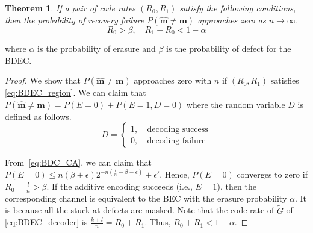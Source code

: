 \documentclass[10pt,twocolumn,twoside,submit]{JCNtran}
\newtheorem{theorem}{Theorem}
\begin{document}
	\begin{theorem} \label{thm:BDEC_region}
		If a pair of code rates $\left(R_0, R_1\right)$ satisfy the following conditions, then the probability of recovery failure $P\left( \widehat{\mathbf{m}} \ne \mathbf{m} \right)$ approaches zero as $n \rightarrow \infty$.
		\begin{equation}
			R_0  > \beta, \quad R_1 + R_0 < 1 - \alpha \label{eq:BDEC_region}
		\end{equation}
	\end{theorem}
	where $\alpha$ is the probability of erasure and $\beta$ is the probability of defect for the BDEC. 
	
	\begin{proof}
		We show that $P\left( \widehat{\mathbf{m}} \ne \mathbf{m} \right)$ approaches zero with $n$ if $\left(R_0, R_1\right)$ satisfies \eqref{eq:BDEC_region}. We can claim that $P\left( \widehat{\mathbf{m}} \ne \mathbf{m} \right) = P\left(E=0\right) + P\left(E=1, D=0\right)$ where the random variable $D$ is defined as follows. 
		\begin{equation} \label{eq:BDEC_D}
		D =
		\begin{cases}
		1, & ~\text{decoding success} \\
		0, & ~\text{decoding failure}
		\end{cases}
		\end{equation}
		
		From~\eqref{eq:BDC_CA}, we can claim that $P\left( E=0 \right) \le n (\beta + \epsilon) 2^{-n \left( \frac{l}{n} - \beta - \epsilon\right)} + \epsilon'$. Hence, $P\left( E=0 \right)$ converges to zero if $R_0 = \frac{l}{n} > \beta$. If the additive encoding succeeds (i.e., $E=1$), then the corresponding channel is equivalent to the BEC with the erasure probability $\alpha$. It is because all the stuck-at defects are masked. Note that the code rate of $\widetilde{G}$ of \eqref{eq:BDEC_decoder} is $\frac{k+l}{n} = R_0 + R_1$. Thus, $R_0 + R_1 < 1 - \alpha$.
	\end{proof}
	
	
\end{document}

